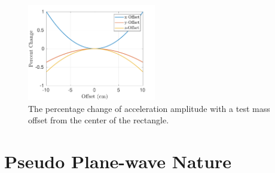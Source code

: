 \documentclass[superscriptaddress, twocolumn, prd]{revtex4-1}
\begin{document}
\begin{figure}[!h]
\centering \includegraphics[width=0.5\textwidth]{Super4_Offset.pdf}
\caption{The percentage change of acceleration amplitude with a test mass offset from the center of the rectangle.}
\label{offset} 
\end{figure}


\section{Pseudo Plane-wave Nature}\label{pseudo}
\end{document}
